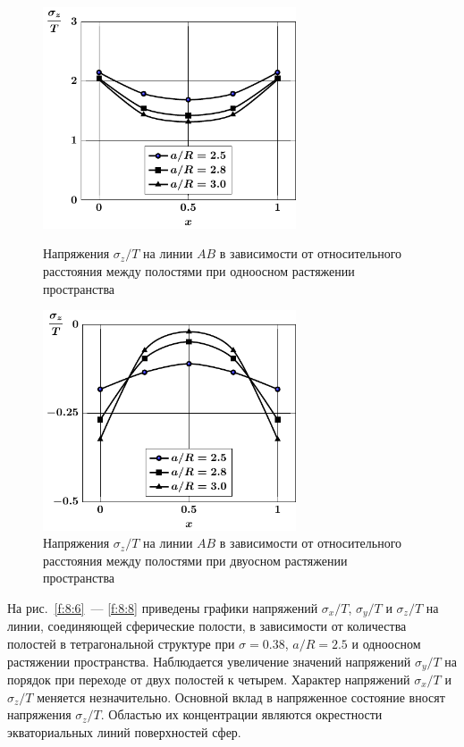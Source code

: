 \begin{figure}[h!]
\centering\footnotesize
\parbox[b]{7.5cm}{\centering\includegraphics[width=7.5cm]{cav4-a-d95-t1-sig_z.pdf}
\caption{Напряжения $\sigma_z/T$ на линии $AB$ в зависимости от относительного расстояния между полостями при одноосном растяжении пространства
\label{f:8:105}}}\hfil\hfil
\parbox[b]{7.5cm}{\centering\includegraphics[width=7.5cm]{cav4-a-d95-t2-sig_z.pdf}
\caption{Напряжения $\sigma_z/T$ на линии $AB$ в зависимости от относительного расстояния между полостями при двуосном растяжении пространства
\label{f:8:106}}}
\end{figure}




На рис.~\ref{f:8:6}~--- \ref{f:8:8} приведены графики напряжений $\sigma_x/T$, $\sigma_y/T$ и $\sigma_z/T$ на линии, соединяющей сферические полости, в зависимости от количества полостей в тетрагональной структуре при $\sigma=0.38$, $a/R=2.5$ и одноосном растяжении пространства. Наблюдается увеличение значений напряжений $\sigma_y/T$	на порядок при переходе от двух полостей к четырем. Характер напряжений $\sigma_x/T$ и $\sigma_z/T$ меняется незначительно. Основной вклад в напряженное состояние вносят напряжения $\sigma_z/T$. Областью их концентрации являются окрестности экваториальных линий поверхностей сфер.

